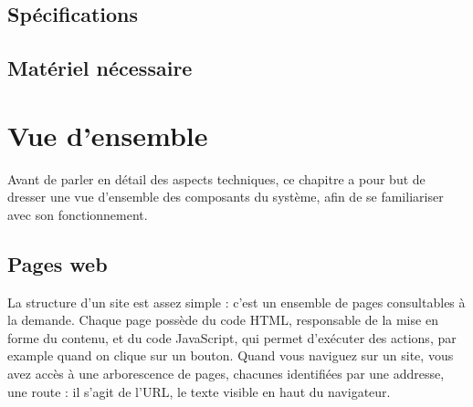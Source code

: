\documentclass[
    iai, %
    eai, %
]{heig-tb}
\begin{document}






\section{Spécifications}
\section{Matériel nécessaire}

\chapter{Vue d'ensemble}

Avant de parler en détail des aspects techniques, ce chapitre a pour but de dresser une vue d'ensemble des composants du système, afin de se familiariser avec son fonctionnement.

\section{Pages web}

La structure d'un site est assez simple : c'est un ensemble de pages consultables à la demande. Chaque page possède du code HTML, responsable de la mise en forme du contenu, et du code JavaScript, qui permet d'exécuter des actions, par example quand on clique sur un bouton.
Quand vous naviguez sur un site, vous avez accès à une arborescence de pages, chacunes identifiées par une addresse, une route : il s'agit de l'URL, le texte visible en haut du navigateur.
\end{document}

